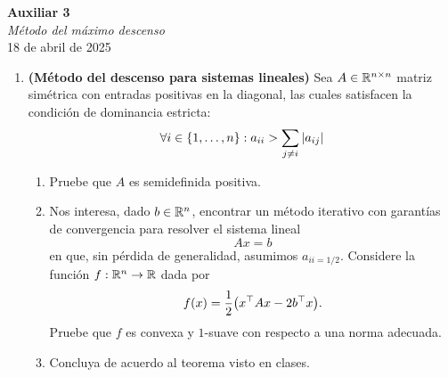 \documentclass{article}
\begin{document}


\begin{center}
    \Huge{\textbf{Auxiliar 3}}\\
\textit{\large{Método del máximo descenso}}\\
    \normalsize
	18 de abril de 2025
\end{center}

\begin{enumerate}
	\item \textbf{(Método del descenso para sistemas lineales)} Sea \(A \in \mathbb{R}^{n \times n}\) matriz simétrica con entradas positivas en la diagonal, las cuales satisfacen la condición de dominancia estricta:
		\[\forall i \in \qty{1, \dots, n} : a_{ii} > \sum_{j \neq i} |a_{ij}|\]
		\begin{enumerate}
			\item Pruebe que \(A\) es semidefinida positiva.
			\item Nos interesa, dado \(b \in \mathbb{R}^n\), encontrar un método iterativo con garantías de convergencia para resolver el sistema lineal
				\[Ax = b\]
				en que, sin pérdida de generalidad, asumimos \(a_{ii = 1/2}\). Considere la función \(f: \mathbb{R}^n \to \mathbb{R}\) dada por
				\[f(x) = \frac12 \qty(x^\top A x - 2b^\top x).\]
				Pruebe que \(f\) es convexa y \(1\)-suave con respecto a una norma adecuada.
			\item Concluya de acuerdo al teorema visto en clases.
		\end{enumerate}
\end{enumerate}
\end{document}
